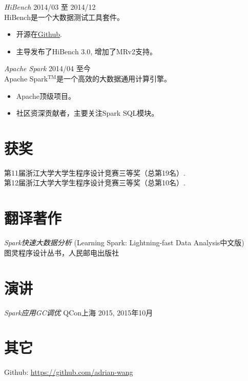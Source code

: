 \documentclass[line,margin]{res}
\begin{document}
\begin{resume}
                {\sl HiBench} \hfill        2014/03 至 2014/12 \\
                HiBench是一个大数据测试工具套件。
                  \begin{itemize}
                   \item 开源在\href{https://github.com/intel-hadoop/HiBench}{Github}.
                   \item 主导发布了HiBench 3.0, 增加了MRv2支持。
                   \end{itemize}

                {\sl Apache Spark} \hfill        2014/04 至今\\
                Apache Spark$^{\textrm{TM}}$是一个高效的大数据通用计算引擎。
                  \begin{itemize}
                   \item Apache顶级项目。
                   \item 社区资深贡献者，主要关注Spark SQL模块。
                   \end{itemize}

\section{获奖}
            第11届浙江大学大学生程序设计竞赛三等奖（总第19名）.\\
            第12届浙江大学大学生程序设计竞赛三等奖（总第10名）.

\section{翻译著作}
            {\sl Spark快速大数据分析} (Learning Spark: Lightning-fast Data Analysis中文版) \\
            \hfill 图灵程序设计丛书，人民邮电出版社

\section{演讲}
            {\sl Spark应用GC调优} \hfill QCon上海 2015, 2015年10月\\

\section{其它}
	Github: \href{https://github.com/adrian-wang}{https://github.com/adrian-wang}
\end{resume}
\end{document}
